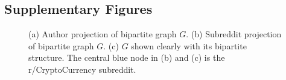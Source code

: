 \documentclass[twoside]{report}
\begin{document}
\begin{spacing}{1}


\appendix
\chapter{Supplementary Figures}\label{app:supplementary figures}

\begin{figure}[h]
\begin{minipage}{.5\linewidth}
\centering
{}
\end{minipage}%
\begin{minipage}{.5\linewidth}
\centering
{}
\end{minipage}\par\medskip
\centering
{}
\caption{(a) Author projection of bipartite graph $G$. (b) Subreddit projection of bipartite graph $G$. (c) $G$ shown clearly with its bipartite structure. The central blue node in (b) and (c) is the r/CryptoCurrency subreddit.}
\label{fig:bipartite}
\end{figure}








\end{spacing}
\end{document}
